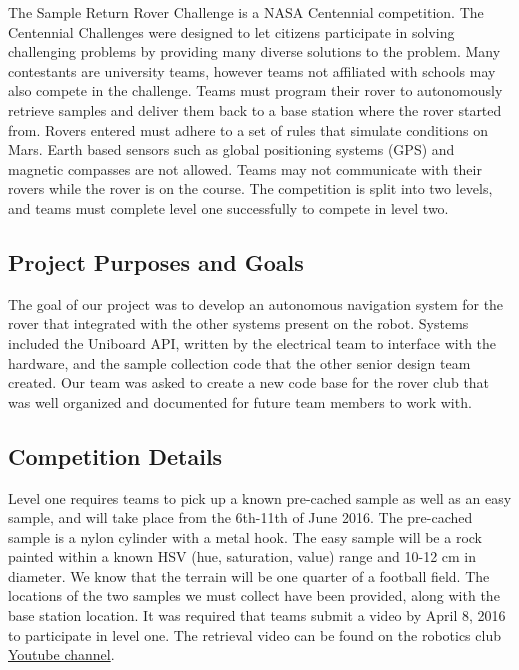 \documentclass[10pt, oneside,onecolumn]{IEEEtran}
\begin{document}
\begin{titlepage}
The Sample Return Rover Challenge is a NASA Centennial competition. The Centennial Challenges were designed to let citizens participate in solving challenging problems by providing many diverse solutions to the problem. Many contestants are university teams, however teams not affiliated with schools may also compete in the challenge. Teams must program their rover to autonomously retrieve samples and deliver them back to a base station where the rover started from. Rovers entered must adhere to a set of rules that simulate conditions on Mars. Earth based sensors such as global positioning systems (GPS) and magnetic compasses are not allowed. Teams may not communicate with their rovers while the rover is on the course. The competition is split into two levels, and teams must complete level one successfully to compete in level two. 

\subsection{Project Purposes and Goals}

The goal of our project was to develop an autonomous navigation system for the rover that integrated with the other systems present on the robot. Systems included the Uniboard API, written by the electrical team to interface with the hardware, and the sample collection code that the other senior design team created. Our team was asked to create a new code base for the rover club that was well organized and documented for future team members to work with.

\subsection{Competition Details}

Level one requires teams to pick up a known pre-cached sample as well as an easy sample, and will take place from the 6th-11th of June 2016. The pre-cached sample is a nylon cylinder with a metal hook. The easy sample will be a rock painted within a known HSV (hue, saturation, value) range and 10-12 cm in diameter. We know that the terrain will be one quarter of a football field. The locations of the two samples we must collect have been provided, along with the base station location. It was required that teams submit a video by April 8, 2016 to participate in level one. The retrieval video can be found on the robotics club \href{https://www.youtube.com/watch?v=H8sDekAOodg}{Youtube channel}.


\end{titlepage}
\end{document}
